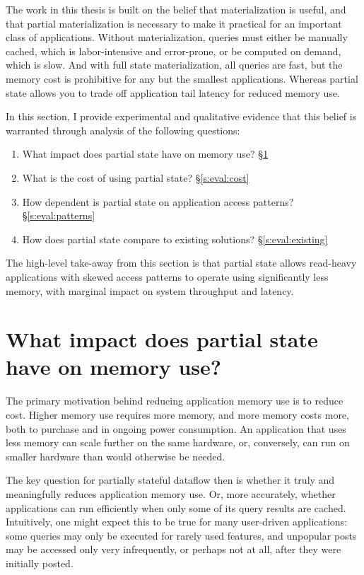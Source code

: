 The work in this thesis is built on the belief that materialization is useful,
and that partial materialization is necessary to make it practical for an
important class of applications. Without materialization, queries must either be
manually cached, which is labor-intensive and error-prone, or be computed on
demand, which is slow. And with full state materialization, all queries are
fast, but the memory cost is prohibitive for any but the smallest applications.
Whereas partial state allows you to trade off application tail latency for
reduced memory use.

In this section, I provide experimental and qualitative evidence that this
belief is warranted through analysis of the following questions:

\begin{enumerate}
 \item What impact does partial state have on memory use? \S\ref{s:eval:mem}
 \item What is the cost of using partial state? \S\ref{s:eval:cost}
 \item How dependent is partial state on application access patterns? \S\ref{s:eval:patterns}
 \item How does partial state compare to existing solutions? \S\ref{s:eval:existing}
\end{enumerate}

The high-level take-away from this section is that partial state allows
read-heavy applications with skewed access patterns to operate using
significantly less memory, with marginal impact on system throughput and
latency.

\section{What impact does partial state have on memory use?}
\label{s:eval:mem}

The primary motivation behind reducing application memory use is to reduce cost.
Higher memory use requires more memory, and more memory costs more, both to
purchase and in ongoing power consumption. An application that uses less
memory can scale further on the same hardware, or, conversely, can run on
smaller hardware than would otherwise be needed.

The key question for partially stateful dataflow then is whether it truly and
meaningfully reduces application memory use. Or, more accurately, whether
applications can run efficiently when only some of its query results are cached.
Intuitively, one might expect this to be true for many user-driven applications:
some queries may only be executed for rarely used features, and unpopular posts
may be accessed only very infrequently, or perhaps not at all, after they were
initially posted.

